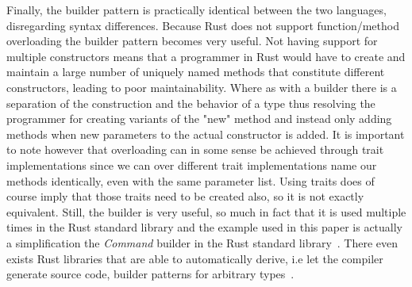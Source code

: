 \documentclass[conference]{IEEEtran}
\begin{document}
Finally, the builder pattern is practically identical between the two languages, disregarding syntax differences.
Because Rust does not support function/method overloading the builder pattern becomes very useful.
Not having support for multiple constructors means that a programmer in Rust would have to create and maintain a large number of uniquely named methods that constitute different constructors, leading to poor maintainability.
Where as with a builder there is a separation of the construction and the behavior of a type thus resolving the programmer for creating variants of the "new" method and instead only adding methods when new parameters to the actual constructor is added.
It is important to note however that overloading can in some sense be achieved through trait implementations since we can over different trait implementations name our methods identically, even with the same parameter list.
Using traits does of course imply that those traits need to be created also, so it is not exactly equivalent.
Still, the builder is very useful, so much in fact that it is used multiple times in the Rust standard library and the example used in this paper is actually a simplification the \emph{Command} builder in the Rust standard library~\cite{rustdoc:command}.
There even exists Rust libraries that are able to automatically derive, i.e let the compiler generate source code, builder patterns for arbitrary types~\cite{cratesio:builder}.




%
%
%
%
%

\clearpage






\end{document}
